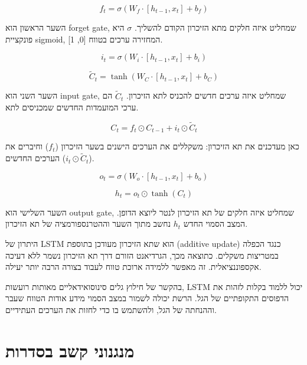 \begin{equation}
f_t = \sigma(W_f \cdot [h_{t-1}, x_t] + b_f)
\end{equation}

השער הראשון הוא \textenglish{forget gate}, שמחליט איזה חלקים מתא הזיכרון הקודם להשליך. $\sigma$ היא פונקציית \textenglish{sigmoid}, המחזירה ערכים בטווח [0, 1].

\begin{equation}
i_t = \sigma(W_i \cdot [h_{t-1}, x_t] + b_i)
\end{equation}

\begin{equation}
\tilde{C}_t = \tanh(W_C \cdot [h_{t-1}, x_t] + b_C)
\end{equation}

השער השני הוא \textenglish{input gate}, שמחליט איזה ערכים חדשים להכניס לתא הזיכרון. $\tilde{C}_t$ הם ערכי המועמדות החדשים שמכניסים לתא.

\begin{equation}
C_t = f_t \odot C_{t-1} + i_t \odot \tilde{C}_t
\end{equation}

כאן מעדכנים את תא הזיכרון: משקללים את הערכים הישנים בשער הזיכרון ($f_t$) וחיברים את הערכים החדשים ($i_t \odot \tilde{C}_t$).

\begin{equation}
o_t = \sigma(W_o \cdot [h_{t-1}, x_t] + b_o)
\end{equation}

\begin{equation}
h_t = o_t \odot \tanh(C_t)
\end{equation}

השער השלישי הוא \textenglish{output gate}, שמחליט איזה חלקים של תא הזיכרון לנטר ליוצא הדופן. המצב הסמוי החדש $h_t$ נחשב מתוך השער וההטרנספורמציה של תא הזיכרון.

היתרון של LSTM הוא שתא הזיכרון מעודכן בתוספת (additive update) כנגד הכפלה במטריצות משקלים. כתוצאה מכך, הגרדיאנט הזורם דרך תא הזיכרון נשמר ללא דעיכה אקספוננציאלית. זה מאפשר ללמידה ארוכת טווח לעבוד בצורה הרבה יותר יעילה.

בהקשר של חילוץ גלים סינוסואידאליים מאותות רועשות, LSTM יכול ללמוד בקלות לזהות את הדפוסים התקופתיים של הגל. הרשת יכולה לשמור במצב הסמוי מידע אודות הטווח שעבר וההנחתה של הגל, ולהשתמש בו כדי לחזות את הערכים העתידיים.

\section{מנגנוני קשב בסדרות}

